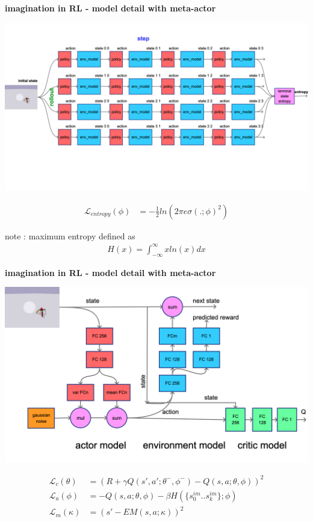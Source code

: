 \documentclass[xcolor=dvipsnames]{beamer}
\begin{document}
\begin{frame}{\bf imagination in RL - model detail with meta-actor}

  {\centering \includegraphics[scale=0.08]{../diagrams/imaginationentropy.png}}

  \begin{align*}
    \mathcal{L}_{entropy}(\phi) &= -\frac{1}{2} ln(2\pi e \sigma(.;\phi)^2)
  \end{align*}


  note : maximum entropy defined as
    \begin{align*}
      H(x) = \int_{-\infty}^{\infty} x ln(x)dx
    \end{align*}
\end{frame}



\begin{frame}{\bf imagination in RL - model detail with meta-actor}

  {\centering \includegraphics[scale=0.1]{../diagrams/imaginationmodeldetail.png}}

  
    \begin{align*}
      \mathcal{L}_c(\theta) &= \left( R + \gamma Q(s', a'; \theta^-, \phi^- ) - Q(s, a; \theta, \phi )  \right)^2 \\
      \mathcal{L}_a(\phi) &= -Q(s, a; \theta, \phi) - \beta H(\{s^{im}_0 .. s^{im}_k\}; \phi) \\
      \mathcal{L}_m(\kappa) &= \left( s' - EM(s, a; \kappa)  \right)^2 \\    
    \end{align*}
\end{frame}
\end{document}
